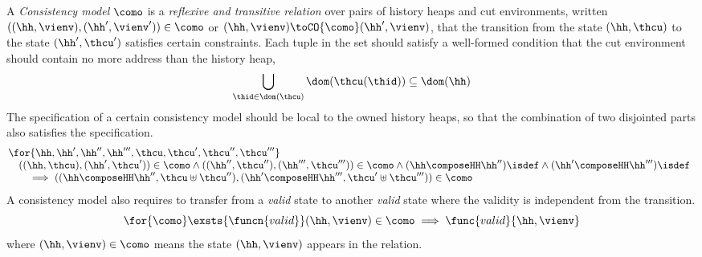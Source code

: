 \begin{defn}
\label{def:consistency-models}
A \emph{Consistency model} \( \como \) is a \emph{reflexive and transitive relation} over pairs of history heaps and cut environments, written \( ((\hh,\vienv),(\hh',\vienv')) \in \como \) or \( (\hh, \vienv) \toCO{\como} (\hh', \vienv )\), that the transition from the state \( (\hh,\thcu)\) to the state \( (\hh',\thcu') \) satisfies certain constraints.
Each tuple in the set should satisfy a well-formed condition that the cut environment should contain no more address than the history heap,
\[
    \bigcup\limits_{\thid \in \dom(\thcu)} \dom(\thcu(\thid)) \subseteq \dom(\hh)
\]
The specification of a certain consistency model should be local to the owned history heaps, so that the combination of two disjointed parts also satisfies the specification.
\[
    \begin{array}{@{}l}
    \for{\hh,\hh',\hh'',\hh''', \thcu, \thcu', \thcu'', \thcu'''} \\
        \quad ((\hh, \thcu),(\hh',\thcu')) \in \como 
        \land ((\hh'', \thcu''),(\hh''',\thcu''')) \in\como 
        \land ( \hh \composeHH \hh'' )\isdef
        \land ( \hh' \composeHH \hh''' )\isdef \\
        \qquad \implies  ((\hh \composeHH \hh'', \thcu \uplus \thcu''),(\hh' \composeHH \hh''',\thcu' \uplus \thcu''')) \in \como
    \end{array}
\]
A consistency model also requires to transfer from a \emph{valid} state to another \emph{valid} state where the validity is independent from the transition.
\[
    \for{\como} \exsts{\funcn{valid}} (\hh, \vienv) \in \como \implies \func{valid}{\hh, \vienv}
\]
where \( (\hh , \vienv) \in \como\) means the state \((\hh, \vienv)\) appears in the relation.
\end{defn}


